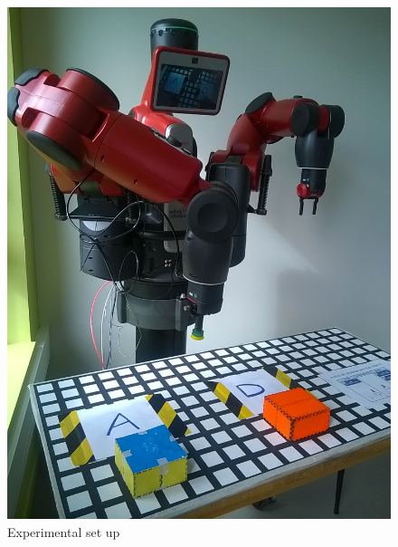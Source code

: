\begin{figure}[h]
\centering
\begin{minipage}{0.5\textwidth}
  \centering
    \includegraphics[scale=0.2]{figures/experiment}
    \caption{Experimental set up}
    \label{fig:Experimental set up}
\end{minipage}%
\begin{minipage}{.5\textwidth}
  \centering

\end{minipage}
\end{figure}
